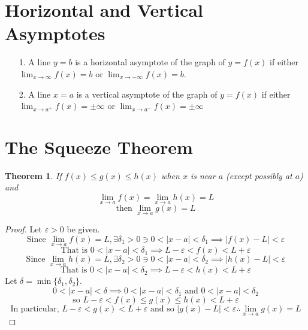 \documentclass[10pt]{report}
\newtheorem{thm2}{Theorem}[section]
\newcommand{\eps}{\varepsilon}
\begin{document}
\section{Horizontal and Vertical Asymptotes}
\begin{itemize}
\item[1.]A line $y = b$ is a horizontal asymptote of the graph of $y = f(x)$ if either $\lim_{x\to \infty}f(x) = b$ or $\lim_{x\to -\infty} f(x) = b$.\\
\item[2.]A line $x = a$ is a vertical asymptote of the graph of $y = f(x)$ if either $\lim_{x\to a^{+}}f(x) = \pm\infty$ or $\lim_{x\to a^{-}}f(x) = \pm\infty$
\end{itemize}
\section{The Squeeze Theorem}
\begin{thm2}If $f(x)\leq g(x)\leq h(x)$ when $x$ is near $a$ (except possibly at $a$) and 
$$\lim_{x\to a}f(x)=\lim_{x\to a}h(x)=L$$
$$\text{then  }\lim_{x\to a}g(x)=L$$
\end{thm2}
\begin{proof}
Let $\eps>0$ be given.\\ $$\text{Since  }\lim_{x\to a}f(x)=L, \exists \delta_1>0\ni 0<|x-a|<\delta_1 \implies |f(x)-L|<\eps$$
$$\text{That is  }0<|x-a|<\delta_1 \implies L-\eps <f(x)<L+\eps$$
$$\text{Since  }\lim_{x\to a}h(x)=L, \exists \delta_2>0\ni 0<|x-a|<\delta_2 \implies |h(x)-L|<\eps$$
$$\text{That is  }0<|x-a|<\delta_2 \implies L-\eps <h(x)<L+\eps$$
Let $\delta=\min\{\delta_1,\delta_2\}.$ $$0<|x-a|<\delta\implies 0< |x-a|<\delta_1\text{ and }0<|x-a|<\delta_2$$
$$\text{so  }L-\eps<f(x)\leq g(x)\leq h(x)<L+\eps$$
$$\text{In particular,  } L-\eps< g(x)< L+\eps\text{ and so }|g(x)-L|<\eps\therefore\lim_{x\to a}g(x)=L$$
\end{proof}
\end{document}
